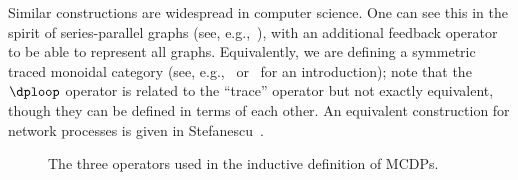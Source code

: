 Similar constructions are widespread in computer science. One can
see this in the spirit of series-parallel graphs (see, e.g.,~\cite{duffin65topology}),
with an additional feedback operator to be able to represent all graphs.
Equivalently, we are defining a symmetric traced monoidal category
(see, e.g.,~\cite{joyal96traced} or~\cite{spivak14category} for
an introduction); note that the~$\dploop$ operator is related to
the ``trace'' operator but not exactly equivalent, though they can
be defined in terms of each other. An equivalent construction for
network processes is given in Stefanescu~\cite{stefanescu00}.

\begin{figure}[h]
\centering{}\hfill{}\hfill{}\hfill{}\smallskip{}
\caption{\label{fig:series-par-loop}The three operators used in the inductive
definition of MCDPs.}
\end{figure}

